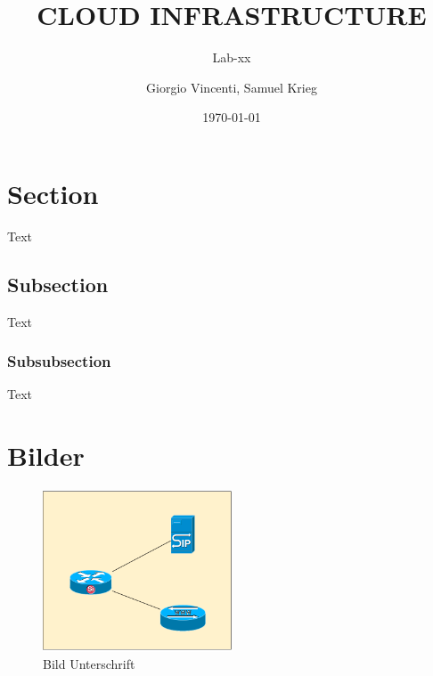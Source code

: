 \documentclass[a4paper,10pt]{scrartcl}
\title{CLOUD INFRASTRUCTURE}
\subtitle{Lab-xx}
\author{Giorgio Vincenti, Samuel Krieg}
\date{\today}
\begin{document}
\maketitle
\tableofcontents

\newpage

\section{Section}
Text

\subsection{Subsection}
Text

\subsubsection{Subsubsection}
Text

\section{Bilder}
\begin{figure} [h]
\begin{center}

\includegraphics[width=0.50\textwidth]{./pictures/sample_picture.pdf}
\caption{Bild Unterschrift}
\label{Bild Referenz}
\end{center}
\end{figure}
\end{document}
